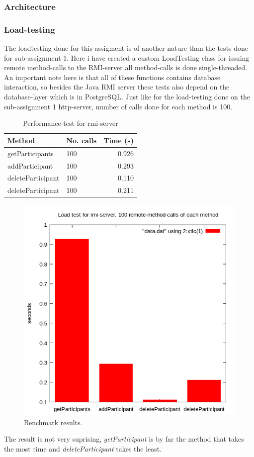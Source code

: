 \documentclass[a4paper, 11pt]{article}
\begin{document}
\subsubsection{Architecture}
\subsubsection{Load-testing}
The loadtesting done for this assigment is of another nature than the tests done for sub-assignment 1. Here i have created a custom LoadTesting class for issuing remote method-calls to the RMI-server all method-calls is done single-threaded. An important note here is that all of these functions contains database interaction, so besides the Java RMI server these tests also depend on the database-layer which is in PostgreSQL. Just like for the load-testing done on the sub-assignment 1 http-server, number of calls done for each method is 100.\\
\begin{table}[H]
\centering
\label{Performance test for rmi-server}
\begin{tabular}{|l|l|r|}
\hline
\textbf{Method}  & \textbf{No. calls} & \textbf{Time (s)} \\ \hline
getParticipants	& 100 & 0.926 \\ \hline
addParticipant	& 100 & 0.293 \\ \hline
deleteParticipant & 100 & 0.110 \\ \hline
deleteParticipant & 100 & 0.211 \\ \hline
\end{tabular}
\caption{Performance-test for rmi-server}
\end{table}
\begin{figure}[H]
\includegraphics[scale=0.7]{rmiplot.png}
\caption{Benchmark results.}
\end{figure}
The result is not very suprising, \textit{getParticipant} is by far the method that takes the most  time and \textit{deleteParticipant} takes the least. \\
\end{document}
